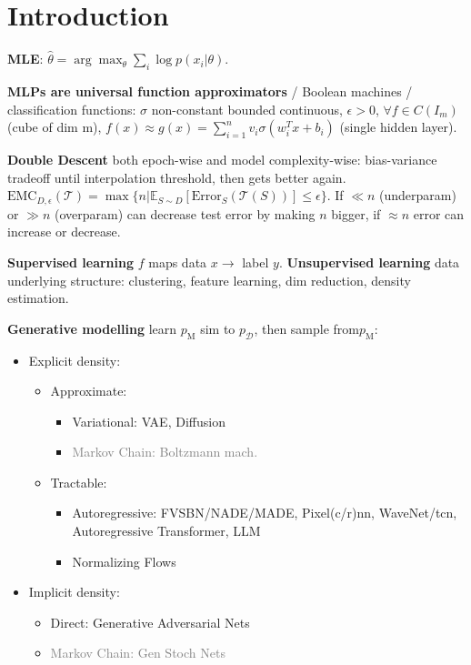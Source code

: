 \section{Introduction}
\textbf{MLE}: \(\hat{\theta} = \arg\max_\theta \sum_{i}\log p(x_i|\theta)\).

\textbf{MLPs are universal function approximators} / Boolean machines / classification functions: $\sigma$ non-constant bounded continuous, $\epsilon > 0$, $\forall f \in C(I_m)$ (cube of dim m), $f(x) \approx g(x) = \sum_{i=1}^{n} v_i \sigma(w_i^T x + b_i)$ (single hidden layer).

\textbf{Double Descent} both epoch-wise and model complexity-wise: bias-variance tradeoff until interpolation threshold, then gets better again. $\text{EMC}_{D,\epsilon}(\mathcal{T}) = \max\{n | \mathbb{E}_{S\sim D}\left[\text{Error}_S(\mathcal{T}(S))\right] \leq \epsilon\}$. If $\ll n$ (underparam) or $\gg n$ (overparam) can decrease test error by making $n$ bigger, if $\approx n$ error can increase or decrease.

\textbf{Supervised learning} \(f\) maps data \(x\to\) label \(y\).
\textbf{Unsupervised learning} data underlying structure: clustering, feature learning, dim reduction, density estimation.

\textbf{Generative modelling} learn \(p_{\text{M}}\) sim to \(p_{\mathcal{D}}\), then sample from\(p_{\text{M}}\):
\begin{itemize}
    \item Explicit density: \begin{itemize}
        \item Approximate: \begin{itemize}
            \item Variational: VAE, Diffusion
            \item \textcolor{gray}{Markov Chain: Boltzmann mach.}
        \end{itemize}
        \item Tractable: \begin{itemize}
            \item Autoregressive: FVSBN/NADE/MADE, Pixel(c/r)nn, WaveNet/tcn, Autoregressive Transformer, LLM
            \item Normalizing Flows
        \end{itemize}
    \end{itemize}
    \item Implicit density: \begin{itemize}
        \item Direct: Generative Adversarial Nets
        \item \textcolor{gray}{Markov Chain: Gen Stoch Nets}
    \end{itemize}
\end{itemize}